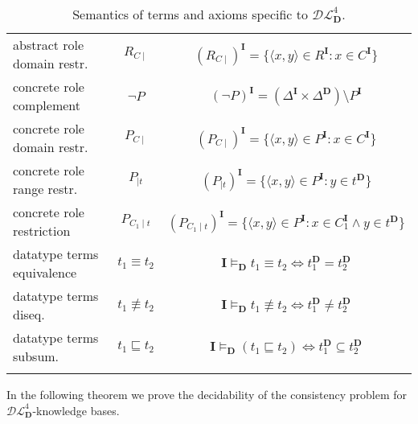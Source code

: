 \documentclass[a4paper]{llncs}
\newcommand{\shdlss}{\mathcal{DL}_{\D}^{4}}
\newcommand{\I}{\mathbf{I}}
\newcommand{\D}{\mathbf{D}}
\begin{document}
{\begin{longtable}{|>{\centering}m{4cm}|c|c|}
abstract role domain restr. & $R_{C \mid }$ & $ (R_{C \mid })^\I = \{ \langle x,y \rangle \in R^\I : x \in C^\I  \} $\\

concrete role complement & $ \neg P $ & $ (\neg P)^\I=(\Delta^\I \times \Delta^\D) \setminus P^\I $\\

concrete role domain restr. & $P_{C \mid }$ & $ (P_{C \mid })^\I = \{ \langle x,y \rangle \in P^\I : x \in C^\I  \} $\\

concrete role range restr. & $P_{ \mid t}$ &  $ (P_{\mid t})^\I = \{ \langle x,y \rangle \in P^\I : y \in t^\D  \} $\\

concrete role restriction & $P_{ C_1 \mid t}$ &  $ (P_{C_1 \mid t})^\I = \{ \langle x,y \rangle \in P^\I : x \in C_1^\I \wedge y \in t^\D  \} $\\

\hline

datatype terms equivalence & $ t_1 \equiv t_2 $ & $ \I \models_{\D} t_1 \equiv t_2 \Longleftrightarrow t_1^{\D} = t_2^{\D}$\\

datatype terms diseq. & $ t_1 \not\equiv t_2 $ & $ \I \models_{\D} t_1 \not\equiv t_2 \Longleftrightarrow t_1^{\D} \neq t_2^{\D}$\\

datatype terms subsum. & $ t_1 \sqsubseteq t_2 $ &  $ \I \models_{\D} (t_1 \sqsubseteq t_2) \Longleftrightarrow t_1^{\D} \subseteq t_2^{\D} $ \\

\hline \caption{Semantics of terms and axioms specific to $\shdlss$.} \label{semdlss}
\end{longtable}
}



In the following theorem we prove the decidability of the consistency problem for $\shdlss$-knowledge bases.
\end{document}
